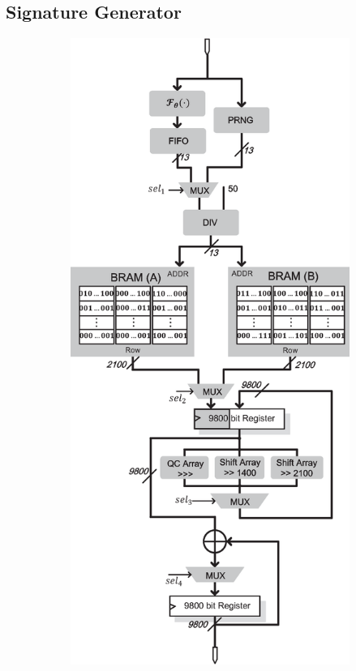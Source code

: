 \documentclass[10pt,journal,compsoc]{IEEEtran}
\begin{document}
\subsection{Signature Generator}
\begin{figure}[!htb]
\centering
\begin{subfigure}{.38\textwidth}\centering
\includegraphics[width=\textwidth]{./fig/siggen-v1.eps}

\end{subfigure}
\end{figure}
\end{document}
